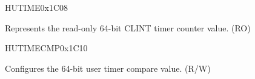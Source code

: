 \begin{register}{H}{UTIME}{0x1C08}\label{regdesc:CLINTUTIMEREG}
%
\regnewline%
%
\regnewline%
\begin{regdesc}
\begin{reglist}
\label{fielddesc:CLINTUTIME}\item [UTIME] Represents the read-only 64-bit CLINT timer counter value. (RO)
\end{reglist}
\end{regdesc}
\end{register}

\begin{register}{H}{UTIMECMP}{0x1C10}\label{regdesc:CLINTUTIMECMPREG}
%
\regnewline%
%
\regnewline%
\begin{regdesc}
\begin{reglist}
\label{fielddesc:CLINTUTIMECMP}\item [UTIMECMP] Configures the 64-bit user timer compare value. (R/W)
\end{reglist}
\end{regdesc}
\end{register}
